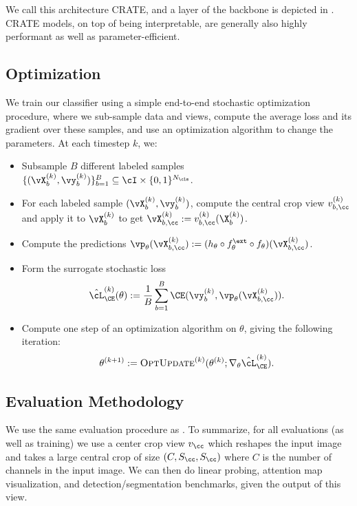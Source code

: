 \documentclass[../../book-main.tex]{subfiles}
\begin{document}
We call this architecture CRATE, and a layer of the backbone is depicted in . CRATE models, on top of being interpretable, are generally also highly performant as well as parameter-efficient. 

\subsection{Optimization} \label{sub:image_classification_optimization}

We train our classifier using a simple end-to-end stochastic optimization procedure, where we sub-sample data and views, compute the average loss and its gradient over these samples, and use an optimization algorithm to change the parameters. At each timestep \(k\), we:
\begin{itemize}
    \item Subsample \(B\) different labeled samples \(\{(\vX_{b}^{(k)}, \vy_{b}^{(k)})\}_{b = 1}^{B} \subseteq \cI \times \{0, 1\}^{N_{\cls}}\).
    \item For each labeled sample \((\vX_{b}^{(k)}, \vy_{b}^{(k)})\), compute the central crop view \(v_{b, \cc}^{(k)}\) and apply it to \(\vX_{b}^{(k)}\) to get \(\vX_{b, \cc}^{(k)} := v_{b, \cc}^{(k)}(\X_{b}^{(k)})\).
    \item Compute the predictions \(\vp_{\theta}(\vX_{b, \cc}^{(k)}) := (h_{\theta} \circ f_{\theta}^{\ext} \circ f_{\theta})(\vX_{b, \cc}^{(k)})\).
    \item Form the surrogate stochastic loss 
    \begin{equation}
        \hat{\cL}_{\CE}^{(k)}(\theta) := \frac{1}{B}\sum_{b = 1}^{B}\CE(\vy_{b}^{(k)}, \vp_{\theta}(\vX_{b, \cc}^{(k)})).
    \end{equation}
    \item Compute one step of an optimization algorithm on \(\theta\), giving the following iteration:
    \begin{equation}
        \theta^{(k + 1)} := \textsc{OptUpdate}^{(k)}(\theta^{(k)}; \nabla_{\theta}\hat{\cL}_{\CE}^{(k)}).
    \end{equation}
\end{itemize}


\subsection{Evaluation Methodology} \label{sub:image_classification_evals}

We use the same evaluation procedure as . To summarize, for all evaluations (as well as training) we use a center crop view \(v_{\cc}\) which reshapes the input image and takes a large central crop of size \((C, S_{\cc}, S_{\cc})\) where \(C\) is the number of channels in the input image. We can then do linear probing, attention map visualization, and detection/segmentation benchmarks, given the output of this view.
\end{document}

